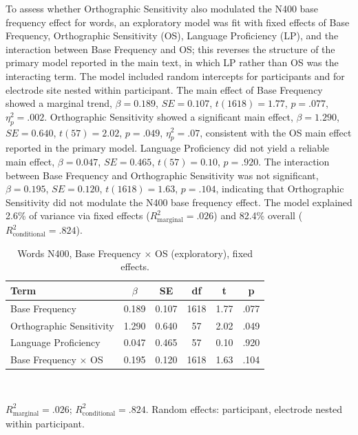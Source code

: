 \documentclass[11pt]{article}
\begin{document}
To assess whether Orthographic Sensitivity also modulated the N400 base frequency effect for words, an exploratory model was fit with fixed effects of Base Frequency, Orthographic Sensitivity (OS), Language Proficiency (LP), and the interaction between Base Frequency and OS; this reverses the structure of the primary model reported in the main text, in which LP rather than OS was the interacting term. The model included random intercepts for participants and for electrode site nested within participant. The main effect of Base Frequency showed a marginal trend, $\beta = 0.189$, $SE = 0.107$, $t(1618) = 1.77$, $p = .077$, $\eta^2_p = .002$. Orthographic Sensitivity showed a significant main effect, $\beta = 1.290$, $SE = 0.640$, $t(57) = 2.02$, $p = .049$, $\eta^2_p = .07$, consistent with the OS main effect reported in the primary model. Language Proficiency did not yield a reliable main effect, $\beta = 0.047$, $SE = 0.465$, $t(57) = 0.10$, $p = .920$. The interaction between Base Frequency and Orthographic Sensitivity was not significant, $\beta = 0.195$, $SE = 0.120$, $t(1618) = 1.63$, $p = .104$, indicating that Orthographic Sensitivity did not modulate the N400 base frequency effect. The model explained 2.6\% of variance via fixed effects ($R^2_{\mathrm{marginal}} = .026$) and 82.4\% overall ($R^2_{\mathrm{conditional}} = .824$).

\begin{table}[h!]
	\centering
	\small
	\caption{Words N400, Base Frequency $\times$ OS (exploratory), fixed effects.}
	\label{tab:s4a}
	\begin{tabular}{lccccc}
		\toprule
		\textbf{Term} & $\beta$ & \textbf{SE} & \textbf{df} & \textbf{t} & \textbf{p} \\
		\midrule
		Base Frequency & 0.189 & 0.107 & 1618 & 1.77 & .077 \\
		Orthographic Sensitivity & 1.290 & 0.640 & 57 & 2.02 & .049 \\
		Language Proficiency & 0.047 & 0.465 & 57 & 0.10 & .920 \\
		Base Frequency $\times$ OS & 0.195 & 0.120 & 1618 & 1.63 & .104 \\
		\bottomrule
	\end{tabular}
	\\[4pt]
	\raggedright \footnotesize $R^2_{\mathrm{marginal}} = .026$; $R^2_{\mathrm{conditional}} = .824$. Random effects: participant, electrode nested within participant.
\end{table}
\end{document}
